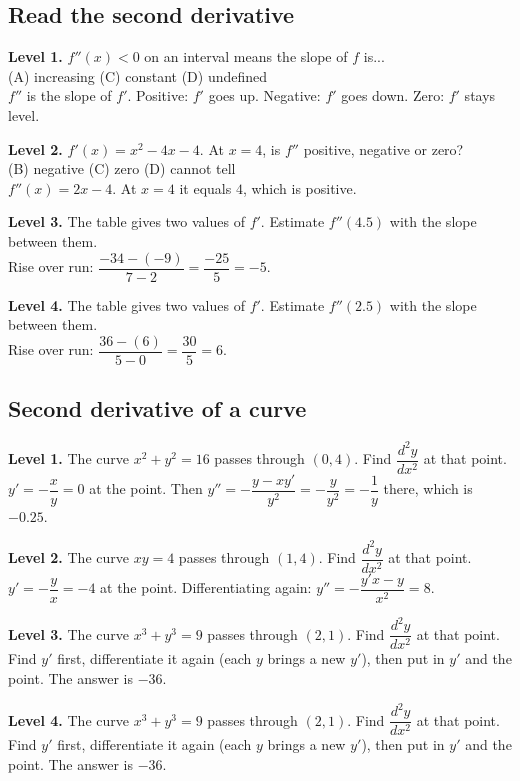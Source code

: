 \documentclass[11pt]{article}
\begin{document}
\subsection*{Read the second derivative}
\noindent\textbf{Level 1.} $f''(x)<0$ on an interval means the slope of $f$ is...\\ (A) increasing \quad {} \quad (C) constant \quad (D) undefined\\  \quad $f''$ is the slope of $f'$. Positive: $f'$ goes up. Negative: $f'$ goes down. Zero: $f'$ stays level.\par\medskip
\noindent\textbf{Level 2.} $f'(x)=x^{2}-4x-4$. At $x=4$, is $f''$ positive, negative or zero?\\  \quad (B) negative \quad (C) zero \quad (D) cannot tell\\  \quad $f''(x)=2x-4$. At $x=4$ it equals $4$, which is positive.\par\medskip
\noindent\textbf{Level 3.} The table gives two values of $f'$. Estimate $f''(4.5)$ with the slope between them.\\  \quad Rise over run: $\dfrac{-34-(-9)}{7-2}=\dfrac{-25}{5}=-5$.\par\medskip
\noindent\textbf{Level 4.} The table gives two values of $f'$. Estimate $f''(2.5)$ with the slope between them.\\  \quad Rise over run: $\dfrac{36-(6)}{5-0}=\dfrac{30}{5}=6$.\par\medskip
\subsection*{Second derivative of a curve}
\noindent\textbf{Level 1.} The curve $x^2+y^2=16$ passes through $(0,4)$. Find $\dfrac{d^2y}{dx^2}$ at that point.\\  \quad $y'=-\dfrac xy=0$ at the point. Then $y''=-\dfrac{y-xy'}{y^2}=-\dfrac{y}{y^2}=-\dfrac1y$ there, which is $-0.25$.\par\medskip
\noindent\textbf{Level 2.} The curve $xy=4$ passes through $(1,4)$. Find $\dfrac{d^2y}{dx^2}$ at that point.\\  \quad $y'=-\dfrac yx=-4$ at the point. Differentiating again: $y''=-\dfrac{y'x-y}{x^2}=8$.\par\medskip
\noindent\textbf{Level 3.} The curve $x^3+y^3=9$ passes through $(2,1)$. Find $\dfrac{d^2y}{dx^2}$ at that point.\\  \quad Find $y'$ first, differentiate it again (each $y$ brings a new $y'$), then put in $y'$ and the point. The answer is $-36$.\par\medskip
\noindent\textbf{Level 4.} The curve $x^3+y^3=9$ passes through $(2,1)$. Find $\dfrac{d^2y}{dx^2}$ at that point.\\  \quad Find $y'$ first, differentiate it again (each $y$ brings a new $y'$), then put in $y'$ and the point. The answer is $-36$.\par\medskip
\end{document}
